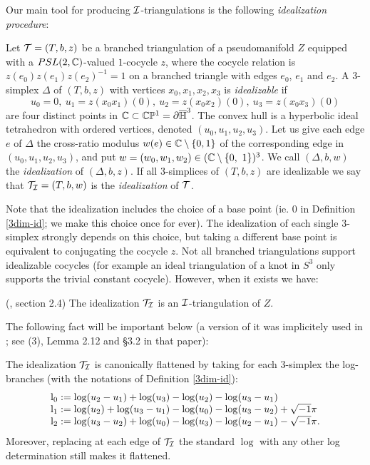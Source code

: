 Our main tool for producing ${\mathcal I}$-triangulations is the following
  {\it idealization procedure}:
\begin{defi}\label{3dim-id}{\rm
Let ${\mathcal T}=(T,b,z)$ be a branched triangulation of a pseudomanifold
$Z$ equipped with a $PSL(2,{\mathbb C})$-valued $1$-cocycle $z$, where the
cocycle relation is $z(e_0)z(e_1)z(e_2)^{-1} = 1$ on a branched
triangle with edges $e_0$, $e_1$ and $e_2$. A $3$-simplex $\Delta$
of $(T,b,z)$ with vertices $x_0,x_1,x_2,x_3$ is {\it idealizable}
if
\begin{equation}\label{vertid}
u_0=0,\ u_1= z(x_0x_1)(0),\ u_2= z(x_0x_2)(0),\ u_3= z(x_0x_3)(0)
\end{equation}
are four distinct points in $\mathbb{C} \subset \mathbb{C}\mathbb{P}^1= \partial
\overline{\mathbb{H}}^3$. The convex hull is a hyperbolic ideal tetrahedron
with ordered vertices, denoted $(u_0,u_1,u_2,u_3)$. Let us give
each edge $e$ of $\Delta$ the cross-ratio modulus $w(e)\in {\mathbb C}
\setminus \{0,1\}$ of the corresponding edge in
$(u_0,u_1,u_2,u_3)$, and put $w=(w_0,w_1,w_2) \in ({\mathbb C} \setminus
\{0,\ 1 \})^3$. We call $(\Delta,b,w)$ the {\it idealization} of
$(\Delta,b,z)$. If all $3$-simplices of $(T,b,z)$ are idealizable
we say that ${\mathcal T}_{{\mathcal I}}=(T,b,w)$ is the {\it idealization} of
${\mathcal T}$.}
\end{defi}
Note that the idealization includes the choice of a base point
(ie. $0$ in Definition \ref{3dim-id}; we make this choice once for
ever).  The idealization of each single $3$-simplex strongly
depends on this choice, but taking a different base point is
equivalent to conjugating the cocycle $z$. Not all branched
triangulations support idealizable cocycles (for example an ideal
triangulation of a knot in $S^3$ only supports the trivial
constant cocycle). However, when it exists we have:
\begin{lem}\label{idealization}{\rm (\cite{BB1}, section 2.4)}
The idealization ${\mathcal T}_{\mathcal I}$ is an ${\mathcal I}$-triangulation of $Z$.
\end{lem}
The following fact will be important below (a version of it was
implicitely used in \cite{BB1}; see (3), Lemma 2.12 and \S 3.2 in
that paper):
\begin{lem}\label{canonicalflat} The idealization ${\mathcal T}_{\mathcal I}$ is
canonically flattened by taking for each $3$-simplex the
log-branches (with the notations of Definition \ref{3dim-id}):
$$\begin{array}{l}{\rm
l}_0:=\log(u_2-u_1)+\log(u_3)-\log(u_2)-\log(u_3-u_1)\\ {\rm
l}_1:=\log(u_2)+\log(u_3-u_1)-\log(u_0)-\log(u_3-u_2)+\sqrt{-1}\pi\\{\rm
l}_2:=\log(u_3-u_2)+\log(u_0)-\log(u_3)-\log(u_2-u_1)-\sqrt{-1}\pi.
\end{array}$$
Moreover, replacing at each edge of ${\mathcal T}_{\mathcal I}$ the standard $\log$ with
any other log determination still makes it flattened.
\end{lem}
